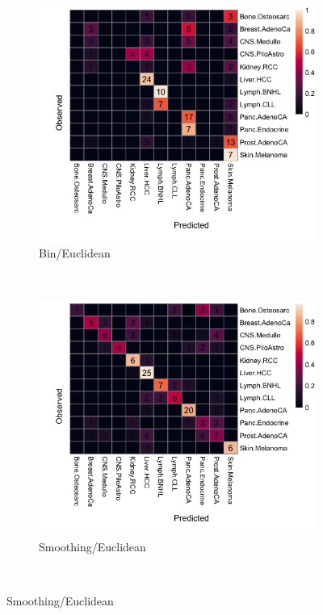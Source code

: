 \begin{figure}[htbp]
    \begin{subfigure}{.5\textwidth}
    \centering
    \includegraphics[width=\textwidth,height=0.9\textwidth]{graphics/confusion_matrix_bins_euclidean.png}
    \caption{Bin/Euclidean}
    \label{fig:confusion_bin_euclidean}
    \end{subfigure}
    ~
    \begin{subfigure}{.5\textwidth}
    \centering
    \includegraphics[width=\textwidth,height=0.9\textwidth]{graphics/confusion_matrix_smooth_euclidean.png}
    \caption{Smoothing/Euclidean}
    \label{fig:confusion_smooth_euclidean}
    \end{subfigure} \\
    \vspace{0.5cm}
    

\end{figure}
